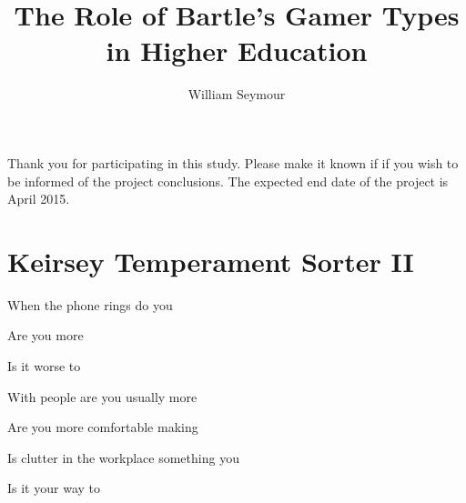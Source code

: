 \documentclass[english,pdf,pagemark,stamp,globalid=\candidateID,oneside,PrintQuestionnaireId=False]{sdaps}
\author{William Seymour}
\title{The Role of Bartle's Gamer Types in Higher Education}
\begin{document}
  \begin{questionnaire}
    \begin{info}
    	Thank you for participating in this study. Please make it known if if you wish to be informed of the project conclusions. The expected end date of the project is April 2015.
    \end{info}

    \section{Keirsey Temperament Sorter II}

\begin{multicols}{2}

\begin{choicequestion}[2]{When the phone rings do you}
\end{choicequestion}
    
\begin{choicequestion}[2]{Are you more}
\end{choicequestion}
    
\begin{choicequestion}[2]{Is it worse to}
    \end{choicequestion}

\begin{choicequestion}[2]{With people are you usually more}
\end{choicequestion}

\begin{choicequestion}[2]{Are you more comfortable making}
\end{choicequestion}

\begin{choicequestion}[2]{Is clutter in the workplace something you}
\end{choicequestion}

\begin{choicequestion}[2]{Is it your way to}
\end{choicequestion}


\end{multicols}
\end{questionnaire}
\end{document}
